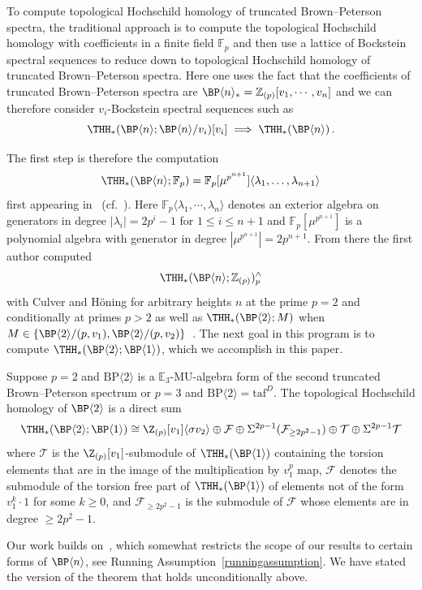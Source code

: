 To compute topological Hochschild homology of truncated Brown--Peterson spectra, the traditional approach is to compute the topological Hochschild homology with coefficients in a finite field $\mathbb{F}_p$ and then use a lattice of Bockstein spectral sequences to reduce down to topological Hochschild homology of truncated Brown--Peterson spectra. Here one uses the fact that the coefficients of truncated Brown--Peterson spectra are $\BP\langle n\rangle_*=\mathbb{Z}_{(p)}[v_1,\cdots ,v_n]$ and we can therefore consider $v_i$-Bockstein spectral sequences such as 
\[ 
\THH_*(\BP\langle n\rangle;\BP\langle n\rangle/v_i)[v_i]\implies \THH_*(\BP\langle n\rangle)\,.
\]

The first step is therefore the computation 
\[ \THH_*(\BP\langle n\rangle;\mathbb{F}_p)=\mathbb{F}_p[\mu^{p^{n+1}}]\langle \lambda_1,\dots ,\lambda_{n+1} \rangle
\]
first appearing in~\cite{ACH24} (cf.~\cite{Ang26}). Here  $\mathbb{F}_p\langle \lambda_1,\cdots ,\lambda_n\rangle$ denotes an exterior algebra on generators in degree $|\lambda_{i}|=2p^i-1$ for $1\le i\le n+1$ and $\mathbb{F}_p[\mu^{p^{n+1}}]$ is a polynomial algebra with generator in degree $|\mu^{p^{n+1}}|=2p^{n+1}$. From there the first author computed 
\[ \THH_*(\BP\langle n\rangle ; \mathbb{Z}_{(p)})_p^{\wedge}\]
with Culver and H\"oning for arbitrary heights $n$ at the prime $p=2$ and conditionally at primes $p>2$ as well as 
$\THH_*(\BP\langle 2\rangle ; M)$
when $M\in \{\BP\langle 2\rangle/(p,v_1),\BP\langle 2\rangle /(p,v_2)\}$~\cite{ACH24}. The next goal in this program is to compute $\THH_*(\BP\langle 2\rangle;\BP\langle 1\rangle)$,
which we accomplish in this paper. 

\begin{theorem}\label{thm:main}
  Suppose $p=2$ and $\mathrm{BP}\langle 2\rangle$ is a $\mathbb{E}_3$-$\mathrm{MU}$-algebra form of the second truncated Brown--Peterson spectrum or $p=3$ and $\mathrm{BP}\langle 2\rangle=\mathrm{taf}^{D}$. 
  The topological Hochschild homology of $\BP\langle 2\rangle$ is a direct sum
  \[
    \THH_*(\BP \langle 2 \rangle ; \BP \langle 1 \rangle) \cong \Z_{(p)}[v_1] \langle \sigma v_2 \rangle \oplus \mathcal{F} \oplus \Sigma^{2p - 1} (\mathcal{F}_{\geq 2p^2 - 1}) \oplus \mathcal{T} \oplus \Sigma^{2p - 1} \mathcal{T}
  \]
  where $\mathcal{T}$ is the $\Z_{(p)}[v_1]$-submodule of $\THH_*(\BP \langle 1 \rangle)$ containing the torsion elements that are in the image of the multiplication by $v_1^p$ map,  $\mathcal{F}$ denotes the submodule of the torsion free part of $\THH_*(\BP \langle 1 \rangle)$ of elements not of the form $v_1^k \cdot 1$ for some $k \geq 0$, and $\mathcal{F}_{\geq 2p^2 -1}$ is the submodule of $\mathcal{F}$ whose elements are in degree $\geq 2p^2 -1$.
\end{theorem}
Our work builds on~\cite[Theorem~3.8]{ACH24}, which somewhat restricts the scope of our results to certain forms of $\BP\langle n\rangle$, see Running Assumption~\ref{runningassumption}. We have stated the version of the theorem that holds unconditionally above. 

